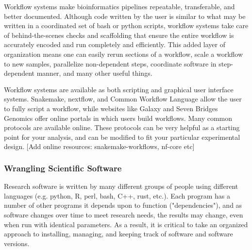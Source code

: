 \documentclass[10pt,letterpaper]{article}
\begin{document}

Workflow systems make bioinformatics pipelines repeatable, transferable, and better documented. 
Although code written by the user is similar to what may be written in a coordinated set of bash or python scripts, workflow systems take care of behind-the-scenes checks and scaffolding that ensure the entire workflow is accurately encoded and run completely and efficiently. 
This added layer of organization means one can easily rerun sections of a workflow, scale a workflow to new samples, parallelize non-dependent steps, coordinate software in step-dependent manner, and many other useful things. 

Workflow systems are available as both scripting and graphical user interface systems. 
Snakemake, nextflow, and Common Workflow Language allow the user to fully script a workflow, while websites like Galaxy and Seven Bridges Genomics offer online portals in which users build workflows. 
Many common protocols are available online. 
These protocols can be very helpful as a starting point for your analysis, and can be modified to fit your particular experimental design. 
[Add online resources: snakemake-workflows, nf-core etc] %


\subsubsection*{Wrangling Scientific Software} 
Research software is written by many different groups of people using different languages (e.g. python, R, perl, bash, C++, rust, etc.). 
Each program has a number of other programs it depends upon to function ("dependencies"), and as software changes over time to meet research needs, the results may change, even when run with identical parameters. 
As a result, it is critical to take an organized approach to installing, managing, and keeping track of software and software versions. 
\end{document}
